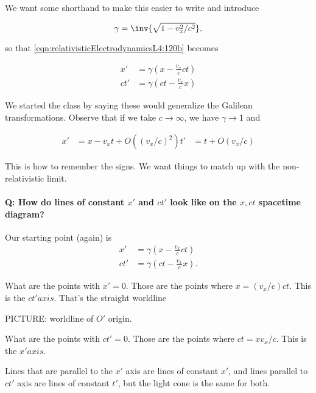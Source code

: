 We want some shorthand to make this easier to write and introduce

\begin{equation}\label{eqn:relativisticElectrodynamicsL4:130}
\gamma = \inv{\sqrt{1 - v_x^2/c^2}},
\end{equation}

so that \ref{eqn:relativisticElectrodynamicsL4:120b} becomes

\begin{align}\label{eqn:relativisticElectrodynamicsL4:140}
x' &=  \gamma \left( x - \frac{v_x}{c} ct \right) \\
ct' &=  \gamma \left( ct - \frac{v_x}{c} x \right)
\end{align}

We started the class by saying these would generalize the Galilean transformations.  Observe that if we take $c \rightarrow \infty$, we have $\gamma \rightarrow 1$ and 

\begin{align}\label{eqn:relativisticElectrodynamicsL4:150}
x' &= x - v_x t + O((v_x/c)^2)
t' &= t  + O(v_x/c)
\end{align}

This is how to remember the signs.  We want things to match up with the non-relativistic limit.

\paragraph{Q: How do lines of constant $x'$ and $ct'$ look like on the $x,ct$ spacetime diagram?}

Our starting point (again) is
\begin{align}\label{eqn:relativisticElectrodynamicsL4:140b}
x' &=  \gamma \left( x - \frac{v_x}{c} ct \right) \\
ct' &=  \gamma \left( ct - \frac{v_x}{c} x \right).
\end{align}

What are the points with $x' = 0$.  Those are the points where $x = (v_x/c) c t$.  This is the $ct' axis$.  That's the straight worldline

PICTURE: worldline of $O'$ origin.

What are the points with $ct' = 0$.  Those are the points where $c t = x v_x/c$.  This is the $x' axis$.

Lines that are parallel to the $x'$ axis are lines of constant $x'$, and lines parallel to $ct'$ axis are lines of constant $t'$, but the light cone is the same for both.

